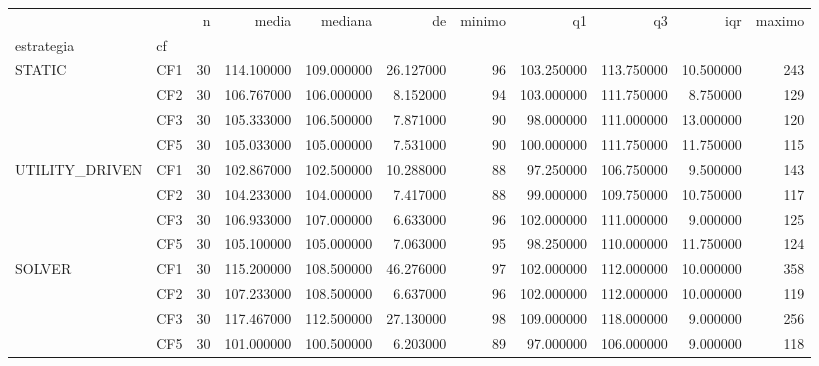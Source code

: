 \begin{tabular}{llrrrrrrrrr}
\toprule
 &  & n & media & mediana & de & minimo & q1 & q3 & iqr & maximo \\
estrategia & cf &  &  &  &  &  &  &  &  &  \\
\midrule
\multirow[t]{4}{*}{STATIC} & CF1 & 30 & 114.100000 & 109.000000 & 26.127000 & 96 & 103.250000 & 113.750000 & 10.500000 & 243 \\
 & CF2 & 30 & 106.767000 & 106.000000 & 8.152000 & 94 & 103.000000 & 111.750000 & 8.750000 & 129 \\
 & CF3 & 30 & 105.333000 & 106.500000 & 7.871000 & 90 & 98.000000 & 111.000000 & 13.000000 & 120 \\
 & CF5 & 30 & 105.033000 & 105.000000 & 7.531000 & 90 & 100.000000 & 111.750000 & 11.750000 & 115 \\
\cline{1-11}
\multirow[t]{4}{*}{UTILITY_DRIVEN} & CF1 & 30 & 102.867000 & 102.500000 & 10.288000 & 88 & 97.250000 & 106.750000 & 9.500000 & 143 \\
 & CF2 & 30 & 104.233000 & 104.000000 & 7.417000 & 88 & 99.000000 & 109.750000 & 10.750000 & 117 \\
 & CF3 & 30 & 106.933000 & 107.000000 & 6.633000 & 96 & 102.000000 & 111.000000 & 9.000000 & 125 \\
 & CF5 & 30 & 105.100000 & 105.000000 & 7.063000 & 95 & 98.250000 & 110.000000 & 11.750000 & 124 \\
\cline{1-11}
\multirow[t]{4}{*}{SOLVER} & CF1 & 30 & 115.200000 & 108.500000 & 46.276000 & 97 & 102.000000 & 112.000000 & 10.000000 & 358 \\
 & CF2 & 30 & 107.233000 & 108.500000 & 6.637000 & 96 & 102.000000 & 112.000000 & 10.000000 & 119 \\
 & CF3 & 30 & 117.467000 & 112.500000 & 27.130000 & 98 & 109.000000 & 118.000000 & 9.000000 & 256 \\
 & CF5 & 30 & 101.000000 & 100.500000 & 6.203000 & 89 & 97.000000 & 106.000000 & 9.000000 & 118 \\
\cline{1-11}
\bottomrule
\end{tabular}
